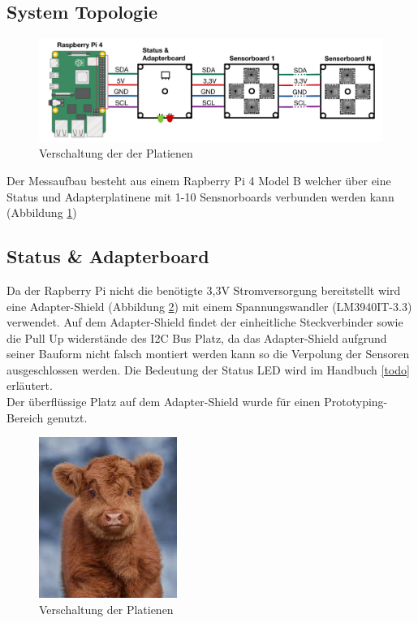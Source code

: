 \subsection{System Topologie}
\begin{figure}[H]
\centering
\includegraphics[width=1\textwidth]{img/System-Topologie.png}
\caption{Verschaltung der der Platienen}
\label{fig:Verschaltung_der_P}
\end{figure}

Der Messaufbau besteht aus einem Rapberry Pi 4 Model B welcher über eine Status und Adapterplatinene mit 1-10 Sensnorboards verbunden werden kann (Abbildung \ref{fig:Verschaltung_der_P})


\subsection{Status \& Adapterboard}
Da der Rapberry Pi nicht die benötigte 3,3V Stromversorgung bereitstellt wird eine Adapter-Shield (Abbildung \ref{fig:Adapter-Shield}) mit einem Spannungswandler (LM3940IT-3.3) verwendet.
Auf dem Adapter-Shield findet der einheitliche Steckverbinder sowie die Pull Up widerstände des I2C Bus Platz, da das Adapter-Shield aufgrund seiner Bauform nicht falsch montiert werden kann so die Verpolung der Sensoren ausgeschlossen werden.
Die Bedeutung der Status LED wird im Handbuch \ref{todo} erläutert.\\
Der überflüssige Platz auf dem Adapter-Shield wurde für einen Prototyping-Bereich genutzt.

\begin{figure}[H]
\centering
\includegraphics[width=0.4\textwidth]{img/test}
\caption{Verschaltung der Platienen}
\label{fig:Adapter-Shield}
\end{figure}
